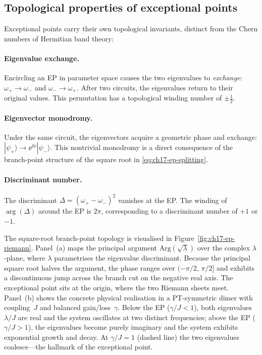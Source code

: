\subsection{Topological properties of exceptional points}
\label{sec:ch17-ep-topology}

Exceptional points carry their own topological invariants, distinct from
the Chern numbers of Hermitian band theory:

\paragraph{Eigenvalue exchange.}
Encircling an EP in parameter space causes the two eigenvalues to
\emph{exchange}: $\omega_+\to\omega_-$ and $\omega_-\to\omega_+$.
After two circuits, the eigenvalues return to their original values.
This permutation has a topological winding number of $\pm\frac{1}{2}$.

\paragraph{Eigenvector monodromy.}
Under the same circuit, the eigenvectors acquire a geometric phase and
exchange: $|\psi_+\rangle\to\ee^{\ii\phi}|\psi_-\rangle$.  This
nontrivial monodromy is a direct consequence of the branch-point
structure of the square root in \eqref{eq:ch17-ep-splitting}.

\paragraph{Discriminant number.}
The discriminant $\Delta=(\omega_+-\omega_-)^2$ vanishes at the EP.
The winding of $\arg(\Delta)$ around the EP is $2\pi$, corresponding
to a discriminant number of $+1$ or $-1$.

The square-root branch-point topology is visualised in
Figure~\ref{fig:ch17-ep-riemann}.  Panel~(a) maps the principal argument
$\mathrm{Arg}(\sqrt{\lambda})$ over the complex $\lambda$-plane, where
$\lambda$ parametrises the eigenvalue discriminant.  Because the principal
square root halves the argument, the phase ranges over $(-\pi/2,\,\pi/2]$ and
exhibits a discontinuous jump across the branch cut on the negative real axis.
The exceptional point sits at the origin, where the two Riemann sheets meet.
Panel~(b) shows the concrete physical realisation in a PT-symmetric dimer with
coupling~$J$ and balanced gain/loss~$\gamma$.  Below the EP
($\gamma/J<1$), both eigenvalues $\lambda/J$ are real and the system oscillates
at two distinct frequencies; above the EP ($\gamma/J>1$), the eigenvalues
become purely imaginary and the system exhibits exponential growth and decay.
At $\gamma/J=1$ (dashed line) the two eigenvalues coalesce---the hallmark of
the exceptional point.

